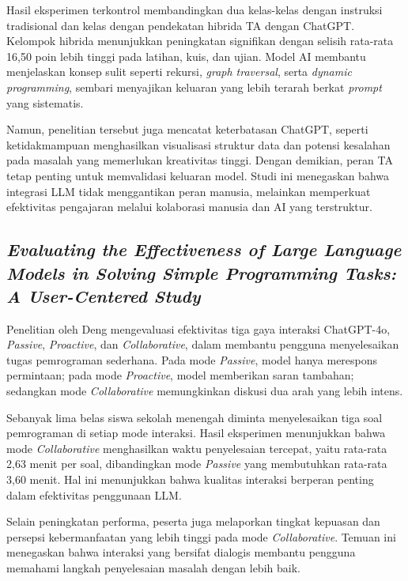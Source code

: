 Hasil eksperimen terkontrol membandingkan dua kelas-kelas dengan instruksi tradisional dan kelas dengan pendekatan hibrida TA dengan ChatGPT. Kelompok hibrida menunjukkan peningkatan signifikan dengan selisih rata-rata 16{,}50 poin lebih tinggi pada latihan, kuis, dan ujian. Model AI membantu menjelaskan konsep sulit seperti rekursi, \textit{graph traversal}, serta \textit{dynamic programming}, sembari menyajikan keluaran yang lebih terarah berkat \textit{prompt} yang sistematis.

Namun, penelitian tersebut juga mencatat keterbatasan ChatGPT, seperti ketidakmampuan menghasilkan visualisasi struktur data dan potensi kesalahan pada masalah yang memerlukan kreativitas tinggi. Dengan demikian, peran TA tetap penting untuk memvalidasi keluaran model. Studi ini menegaskan bahwa integrasi LLM tidak menggantikan peran manusia, melainkan memperkuat efektivitas pengajaran melalui kolaborasi manusia dan AI yang terstruktur.


\subsection{\textit{Evaluating the Effectiveness of Large Language Models in Solving Simple Programming Tasks: A User-Centered Study}}

Penelitian oleh Deng \cite{Deng2025LLMProgrammingTasks} mengevaluasi efektivitas tiga gaya interaksi ChatGPT-4o, \textit{Passive}, \textit{Proactive}, dan \textit{Collaborative}, dalam membantu pengguna menyelesaikan tugas pemrograman sederhana. Pada mode \textit{Passive}, model hanya merespons permintaan; pada mode \textit{Proactive}, model memberikan saran tambahan; sedangkan mode \textit{Collaborative} memungkinkan diskusi dua arah yang lebih intens.

Sebanyak lima belas siswa sekolah menengah diminta menyelesaikan tiga soal pemrograman di setiap mode interaksi. Hasil eksperimen menunjukkan bahwa mode \textit{Collaborative} menghasilkan waktu penyelesaian tercepat, yaitu rata-rata 2{,}63 menit per soal, dibandingkan mode \textit{Passive} yang membutuhkan rata-rata 3{,}60 menit. Hal ini menunjukkan bahwa kualitas interaksi berperan penting dalam efektivitas penggunaan LLM.

Selain peningkatan performa, peserta juga melaporkan tingkat kepuasan dan persepsi kebermanfaatan yang lebih tinggi pada mode \textit{Collaborative}. Temuan ini menegaskan bahwa interaksi yang bersifat dialogis membantu pengguna memahami langkah penyelesaian masalah dengan lebih baik.


